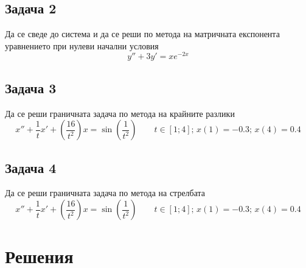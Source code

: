 \documentclass[a4paper,fleqn,12pt]{article}
\begin{document}
\subsection{Задача 2}
Да се сведе до система и да се реши по метода на матричната експонента уравнението при нулеви начални условия
	\begin{equation}
	y''+3y'=xe^{-2x}
	\end{equation}
\subsection{Задача 3}
Да се реши граничната задача по метода на крайните разлики
	\begin{equation}
	x'' + \frac{1}{t} x' + \left( \frac{16}{t^2}\right) x = \sin \left( \frac{1}{t^2}\right) \qquad t \in [1;4]; \, x(1) = -0.3 ; \, x(4) = 0.4
	\end{equation}
\subsection{Задача 4}
Да се реши граничната задача по метода на стрелбата
	\begin{equation}
	x'' + \frac{1}{t} x' + \left( \frac{16}{t^2}\right) x = \sin \left( \frac{1}{t^2}\right) \qquad t \in [1;4]; \, x(1) = -0.3 ; \, x(4) = 0.4
	\end{equation}
\newpage
\section{Решения}
\end{document}
